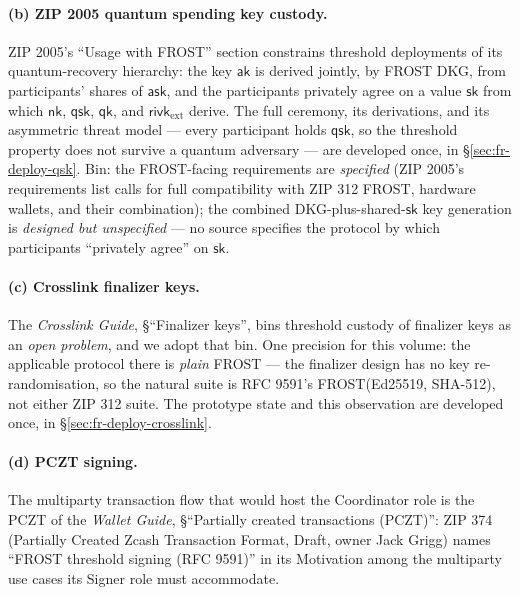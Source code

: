 \documentclass[11pt,a4paper]{article}
\theoremstyle{definition}
\newcommand{\ask}{\ensuremath{\mathsf{ask}}}
\newcommand{\aksym}{\ensuremath{\mathsf{ak}}}
\newcommand{\nksym}{\ensuremath{\mathsf{nk}}}
\begin{document}
\paragraph{(b) ZIP 2005 quantum spending key custody.} ZIP 2005's
``Usage with FROST'' section constrains threshold deployments of its
quantum-recovery hierarchy: the key \aksym{} is derived jointly, by
FROST DKG, from participants' shares of \ask, and the participants
privately agree on a value $\mathsf{sk}$ from which $\nksym$,
$\mathsf{qsk}$, $\mathsf{qk}$, and $\mathsf{rivk}_{\mathrm{ext}}$
derive. The full ceremony, its derivations, and its asymmetric threat
model --- every participant holds $\mathsf{qsk}$, so the threshold
property does not survive a quantum adversary --- are developed once,
in \S\ref{sec:fr-deploy-qsk}. Bin: the FROST-facing requirements are
\emph{specified} (ZIP 2005's requirements list calls for full
compatibility with ZIP 312 FROST, hardware wallets, and their
combination); the combined DKG-plus-shared-$\mathsf{sk}$ key generation
is \emph{designed but unspecified} --- no source specifies the protocol
by which participants ``privately agree'' on $\mathsf{sk}$.

\paragraph{(c) Crosslink finalizer keys.} The \emph{Crosslink Guide},
\S``Finalizer keys'', bins threshold custody of finalizer keys as an
\emph{open problem}, and we adopt that bin. One precision for this
volume: the applicable protocol there is \emph{plain} FROST --- the
finalizer design has no key re-randomisation, so the natural suite is
RFC 9591's FROST(Ed25519, SHA-512), not either ZIP 312 suite. The
prototype state and this observation are developed once, in
\S\ref{sec:fr-deploy-crosslink}.

\paragraph{(d) PCZT signing.} The multiparty transaction flow that
would host the Coordinator role is the PCZT of the \emph{Wallet Guide},
\S``Partially created transactions (PCZT)'': ZIP 374 (Partially Created
Zcash Transaction Format, Draft, owner Jack Grigg) names ``FROST
threshold signing (RFC 9591)'' in its Motivation among the multiparty
use cases its Signer role must accommodate.
\end{document}
